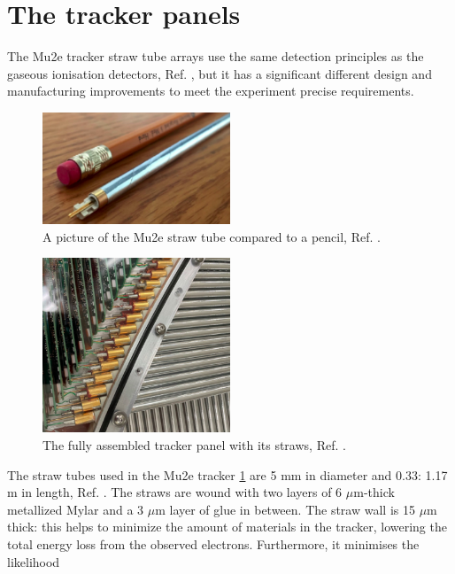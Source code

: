 \section{The tracker panels}
The Mu2e tracker straw tube arrays use the same detection principles as the gaseous ionisation detectors, Ref. \cite{kola}, 
but it has a significant different design and manufacturing improvements to meet the experiment precise requirements.
\begin{figure}[!h]
    \centering
    \includegraphics[width =0.5\textwidth]{figures/png/Screenshot_20240327_000000.png}
    \caption{A picture of the Mu2e straw tube
    compared to a pencil, Ref. \cite{trk}.}
    \label{fig:trkpencil}
    \end{figure}
    \begin{figure}[!h]
        \centering
        \includegraphics[width =0.5\textwidth]{figures/png/Screenshot_20240327_000131.png}
        \caption{The fully assembled tracker panel with its straws, Ref. \cite{trk}.}
        \label{fig:strawtubes}
        \end{figure}
The straw tubes used in the Mu2e tracker \ref{fig:trkpencil} are 5 mm in diameter and 0.33: 1.17 m in length, 
Ref. \cite{bartoszek2015mu2e}. The straws are wound with two layers of 6 $\mu$m-thick metallized Mylar and a 3 
$\mu$m layer of glue in between. The straw wall is 15 $\mu$m thick: this helps to minimize the amount of materials 
in the tracker, lowering the total energy loss from the observed electrons. Furthermore, it minimises the likelihood 
